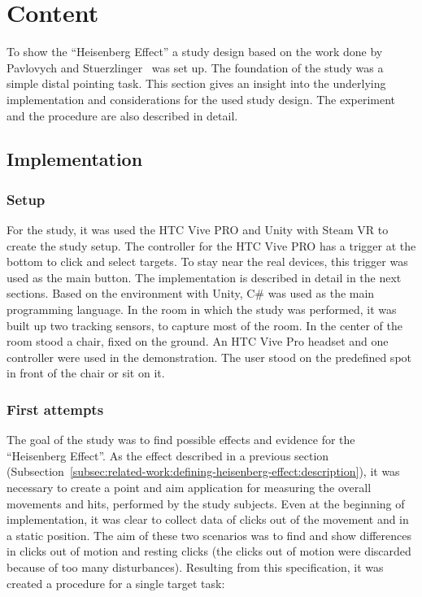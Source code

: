 \chapter{Content}
\label{ch:content}

To show the ``Heisenberg Effect'' a study design based on the work done by Pavlovych and Stuerzlinger~\cite{pavlovych_tradeoff_2009} was set up. The foundation of the study was a simple distal pointing task. This section gives an insight into the underlying implementation and considerations for the used study design. The experiment and the procedure are also described in detail. 

\section{Implementation}
\label{sec:implementation}

\subsection{Setup}
\label{subsec:impl:setup}

For the study, it was used the HTC Vive PRO and Unity with Steam VR to create the study setup. The controller for the HTC Vive PRO has a trigger at the bottom to click and select targets. To stay near the real devices, this trigger was used as the main button. The implementation is described in detail in the next sections. Based on the environment with Unity, C\# was used as the main programming language.
In the room in which the study was performed, it was built up two tracking sensors, to capture most of the room. In the center of the room stood a chair, fixed on the ground. An HTC Vive Pro headset and one controller were used in the demonstration. The user stood on the predefined spot in front of the chair or sit on it. 

\subsection{First attempts}
\label{subsec:impl:first_attempts}

The goal of the study was to find possible effects and evidence for the ``Heisenberg Effect''. As the effect described in a previous section (Subsection~\ref{subsec:related-work:defining-heisenberg-effect:description}), it was necessary to create a point and aim application for measuring the overall movements and hits, performed by the study subjects. Even at the beginning of implementation, it was clear to collect data of clicks out of the movement and in a static position. The aim of these two scenarios was to find and show differences in clicks out of motion and resting clicks (the clicks out of motion were discarded because of too many disturbances). Resulting from this specification, it was created a procedure for a single target task:

